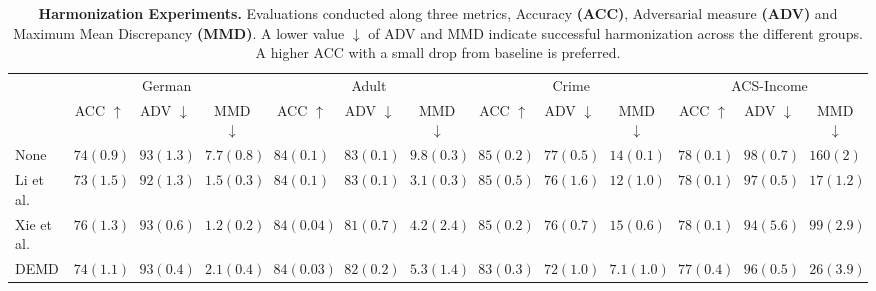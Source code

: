 \begin{table}[!t] 
	\scriptsize
	\setlength\tabcolsep{2.25pt} %
	\caption[Harmonization application comparisons using DEMD regularization]{\textbf{Harmonization Experiments.} Evaluations conducted along three metrics, Accuracy \textbf{(ACC)}, Adversarial measure \textbf{(ADV)} and Maximum Mean Discrepancy \textbf{(MMD)}. A lower value $\downarrow$ of ADV and MMD indicate successful harmonization across the different groups. A higher ACC with a small drop from baseline is preferred. }
	\begin{tabular*}{\linewidth}{l *{3}{c}|*{3}{c}|*{3}{c}|*{3}{c}}
		\midrule%
		& \multicolumn{3}{c}{German} & \multicolumn{3}{c}{Adult} & \multicolumn{3}{c}{Crime}& \multicolumn{3}{c}{ACS-Income} \\
		\cmidrule{2-4} \cmidrule{5-7} \cmidrule{8-10} \cmidrule{11-13}
		& ACC $\uparrow$ & ADV $\downarrow$ & MMD $\downarrow$ & ACC $\uparrow$ & ADV $\downarrow$ & MMD $\downarrow$ & ACC $\uparrow$ & ADV $\downarrow$ & MMD $\downarrow$ & ACC $\uparrow$ & ADV $\downarrow$  & MMD $\downarrow$ \\ 
		\midrule
		None & $74\scriptscriptstyle(0.9)$ & $93\scriptscriptstyle(1.3)$ & $7.7\scriptscriptstyle(0.8)$ & $84\scriptscriptstyle(0.1)$ & $83\scriptscriptstyle(0.1)$ & $9.8\scriptscriptstyle(0.3)$ & $85\scriptscriptstyle(0.2)$ & $77\scriptscriptstyle(0.5)$ & $14\scriptscriptstyle(0.1)$ & $78\scriptscriptstyle(0.1)$ & $98\scriptscriptstyle(0.7)$ & $160\scriptscriptstyle(2)$ \\
		Li et al. & $73\scriptscriptstyle(1.5)$ & $92\scriptscriptstyle(1.3)$ & $1.5\scriptscriptstyle(0.3)$ & $84\scriptscriptstyle(0.1)$ & $83\scriptscriptstyle(0.1)$ & $3.1\scriptscriptstyle(0.3)$ & $85\scriptscriptstyle(0.5)$ & $76\scriptscriptstyle(1.6)$ & $12\scriptscriptstyle(1.0)$ & $78\scriptscriptstyle(0.1)$ & $97\scriptscriptstyle(0.5)$ & $17\scriptscriptstyle(1.2)$ \\
		Xie et al. & $76\scriptscriptstyle(1.3)$ & $93\scriptscriptstyle(0.6)$ & $1.2\scriptscriptstyle(0.2)$ & $84\scriptscriptstyle(0.04)$ & $81\scriptscriptstyle(0.7)$ & $4.2\scriptscriptstyle(2.4)$ & $85\scriptscriptstyle(0.2)$ & $76\scriptscriptstyle(0.7)$ & $15\scriptscriptstyle(0.6)$ & $78\scriptscriptstyle(0.1)$ & $94\scriptscriptstyle(5.6)$ & $99\scriptscriptstyle(2.9)$ \\
		DEMD & $74\scriptscriptstyle(1.1)$ & $93\scriptscriptstyle(0.4)$ & $2.1\scriptscriptstyle(0.4)$ & $84\scriptscriptstyle(0.03)$ & $82\scriptscriptstyle(0.2)$ & $5.3\scriptscriptstyle(1.4)$ & $83\scriptscriptstyle(0.3)$ & $72\scriptscriptstyle(1.0)$ & $7.1\scriptscriptstyle(1.0)$ & $77\scriptscriptstyle(0.4)$ & $96\scriptscriptstyle(0.5)$ & $26\scriptscriptstyle(3.9)$ \\
		\midrule
	\end{tabular*}
	\label{tab:harm_results}
\end{table} 

